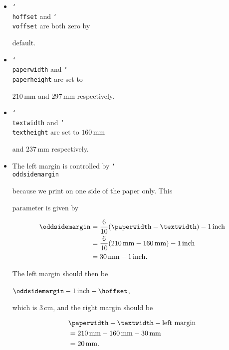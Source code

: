 \documentclass{bhamthesis}
\newcommand{\cm}{\mathrm{cm}}
\newcommand{\mm}{\mathrm{mm}}
\newcommand{\inch}{\mathrm{inch}}
\newcommand{\bksl}{\char`\\}
\newcommand{\cmd}[1]{\texttt{\bksl{}#1}}
\begin{document}
\begin{itemize}
  \begin{itemize}

  \item \cmd{hoffset} and \cmd{voffset} are both zero by

    default.

  \item \cmd{paperwidth} and \cmd{paperheight} are set to

    $210\,\mm$ and $297\,\mm$ respectively.

  \item \cmd{textwidth} and \cmd{textheight} are set to $160\,\mm$

    and $237\,\mm$ respectively.

  \item The left margin is controlled by \cmd{oddsidemargin}

    because we print on one side of the paper only.  This

    parameter is given by

    \begin{align*}

     \text{\cmd{oddsidemargin}}

      &= \frac{6}{10}(\text{\cmd{paperwidth}}-\text{\cmd{textwidth}})

         - 1\,\inch \\

      &= \frac{6}{10}(210\,\mm-160\,\mm) - 1\,\inch \\

      &= 30\,\mm - 1\,\inch.

    \end{align*}

    The left margin should then be

    \(\text{\cmd{oddsidemargin}} - 1\,\inch - \text{\cmd{hoffset}}\),

    which is $3\,\cm$, and the right margin should be

    \begin{align*}

     &\text{\cmd{paperwidth}}

      -\text{\cmd{textwidth}}-\text{left margin} \\

     &= 210\,\mm - 160\,\mm - 30\,\mm \\

     &= 20\,\mm.

    \end{align*}


\end{itemize}
\end{itemize}
\end{document}
